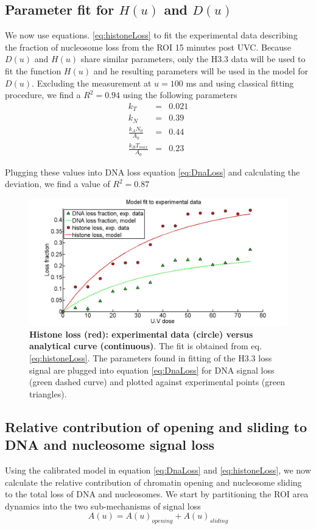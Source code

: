 \documentclass[12pt]{article}
\begin{document}
\subsection{Parameter fit for $H(u)$ and $D(u)$ }\label{subsection:parameterFit}
We now use equations. \ref{eq:histoneLoss} to fit the experimental data describing the fraction of nucleosome loss from the ROI 15 minutes post UVC. Because $D(u)$ and $H(u)$ share similar parameters, only the H3.3 data will be used to fit the function $H(u)$ and he resulting parameters will be used in the model for $D(u)$. 
Excluding the measurement at $u=100$ ms and using classical fitting procedure, we find a $R^2= 0.94$ using the following parameters
\begin{eqnarray*}
k_T &=&  0.021\\
k_N &=&  0.39\\
\frac{k_AN_0}{A_0}&=& 0.44\\
\frac{k_BT_{max}}{A_0}&=& 0.23
\end{eqnarray*}

Plugging these values into DNA loss equation \ref{eq:DnaLoss} and calculating the deviation, we find a value of $R^2=0.87$
\begin{figure}[H]
\centering
\includegraphics[width=0.6\linewidth, height=0.3\textheight]{histoneAndDnaVsUvDoseModelFit}
\caption{\textbf{Histone loss (red): experimental data (circle) versus analytical curve (continuous)}. The fit is obtained from  eq. \ref{eq:histoneLoss}. The parameters found in fitting of the H3.3 loss signal are plugged into equation \ref{eq:DnaLoss} for DNA signal loss (green dashed curve) and plotted against experimental points (green triangles).}
\label{fig:histoneAndDnaVsUvDoseModelFit}
\end{figure}

\subsection{Relative contribution of opening and sliding to DNA and nucleosome signal loss}
Using the calibrated model in equation \ref{eq:DnaLoss} and \ref{eq:histoneLoss}, we now calculate the relative contribution of chromatin opening and nucleosome sliding to the total loss of DNA and nucleosomes.
We start by partitioning the ROI area dynamics into the two sub-mechanisms of signal loss
\begin{equation*}
A(u) = A(u)_{opening}+A(u)_{sliding}
\end{equation*}
\end{document}
